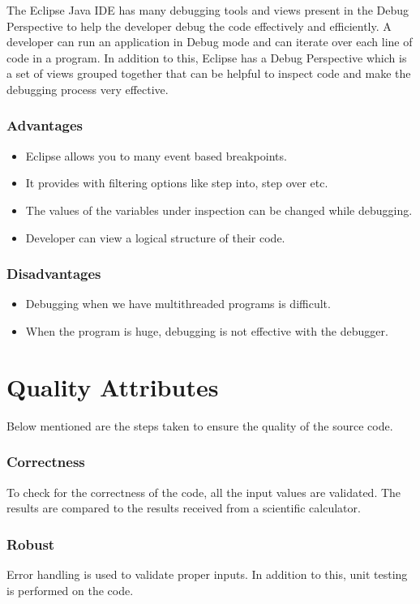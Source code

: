 \documentclass[12pt]{report}
\begin{document}
The Eclipse Java IDE has many debugging tools and views present in the Debug Perspective to help the developer debug the code effectively and efficiently.
A developer can run an application in Debug mode and can iterate over each line of code in a program. In addition to this, Eclipse has a Debug Perspective which is a set of views grouped together that can be helpful to inspect code and make the debugging process very effective.

\subsubsection{Advantages}
\begin{itemize}
\item Eclipse allows you to many event based breakpoints.
\item It provides with filtering options like step into, step over etc.
\item The values of the variables under inspection can be changed while debugging.
\item Developer can view a logical structure of their code.
\end{itemize}

\subsubsection{Disadvantages}
\begin{itemize}
\item Debugging when we have multithreaded programs is difficult.
\item When the program is huge, debugging is not effective with the debugger.
\end{itemize}

\section{Quality Attributes}
Below mentioned are the steps taken to ensure the quality of the source code.
\subsubsection{Correctness}
To check for the correctness of the code, all the input values are validated. The results are compared to the results received from a scientific calculator.
\subsubsection{Robust}
Error handling is used to validate proper inputs. In addition to this, unit testing is performed on the code.
\end{document}
